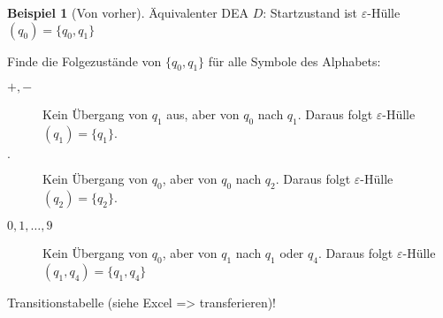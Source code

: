 \documentclass[11pt]{article} %
\theoremstyle{definition}
\newtheorem*{beispiel}{Beispiel}
\begin{document}
\begin{beispiel}[Von vorher]
Äquivalenter DEA $D$: Startzustand ist $\varepsilon$-Hülle$(q_0) = \{q_0, q_1\}$

Finde die Folgezustände von $\{q_0, q_1\}$ für alle Symbole des Alphabets:
\begin{description}
\item[$+, -$] Kein Übergang von $q_1$ aus, aber von $q_0$ nach $q_1$. Daraus folgt $\varepsilon$-Hülle$(q_1) = \{q_1\}$.
\item[$.$] Kein Übergang von $q_0$, aber von $q_0$ nach $q_2$. Daraus folgt $\varepsilon$-Hülle$(q_2) = \{q_2\}$.
\item[$0,1,\dots,9$] Kein Übergang von $q_0$, aber von $q_1$ nach $q_1$ oder $q_4$. Daraus folgt $\varepsilon$-Hülle$(q_1,q_4)
= \{q_1, q_4\}$
\end{description}

Transitionstabelle (siehe Excel => transferieren)!


\end{beispiel}
\end{document}
